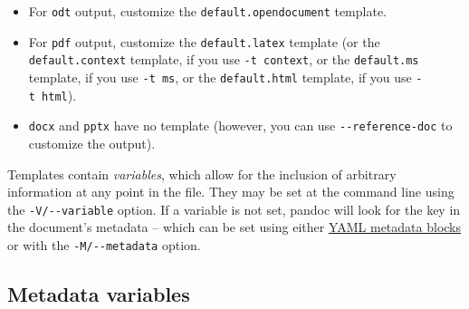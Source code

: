 \documentclass[
  12pt,
  a4paper,
]{article}
\providecommand{\tightlist}{%
  \setlength{\itemsep}{0pt}\setlength{\parskip}{0pt}}
\begin{document}
\begin{itemize}
\tightlist
\item
  For \texttt{odt} output, customize the \texttt{default.opendocument} template.
\item
  For \texttt{pdf} output, customize the \texttt{default.latex} template (or the
  \texttt{default.context} template, if you use \texttt{-t\ context}, or the \texttt{default.ms}
  template, if you use \texttt{-t\ ms}, or the \texttt{default.html} template, if you use
  \texttt{-t\ html}).
\item
  \texttt{docx} and \texttt{pptx} have no template (however, you can use
  \texttt{-\/-reference-doc} to customize the output).
\end{itemize}

Templates contain \emph{variables}, which allow for the inclusion of arbitrary information at any
point in the file. They may be set at the command line using the \texttt{-V/-\/-variable} option.
If a variable is not set, pandoc will look for the key in the document's metadata -- which can be
set using either \protect\hyperlink{extension-yaml_metadata_block}{YAML metadata blocks} or with
the \texttt{-M/-\/-metadata} option.

\hypertarget{metadata-variables}{%
\subsection{Metadata variables}\label{metadata-variables}}
\end{document}
